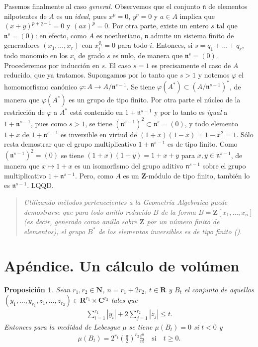 \documentclass[bibtotoc,leqno,spanish]{amsbook}
\newcommand{\RR}{\mathbf{R}}
\newcommand{\ZZ}{\mathbf{Z}}
\newcommand{\NN}{\mathbf{N}}
\newcommand{\CC}{\mathbf{C}}
\newcommand{\idl}[1]{\mathfrak{#1}}
\newcommand{\QED}{LQQD.}
\newcommand{\abs}[1]{\left\lvert#1\right\rvert}
\renewcommand{\to}[1][]{\xrightarrow{#1}}
\numberwithin{equation}{section}
\newenvironment{comm}%
	{\begin{quotation}\itshape\Small}
	{\end{quotation}}
\theoremstyle{note}
\theoremstyle{note}
\newtheorem*{proposition*}{Proposici\'on}
\theoremstyle{rem}
\numberwithin{theorem}{section}
\numberwithin{proposition}{section}
\numberwithin{definition}{section}
\numberwithin{lemma}{section}
\numberwithin{corollary}{section}
\numberwithin{example}{section}
\numberwithin{footnote}{section}%
\begin{document}
Pasemos finalmente al caso {\em general.} Observemos que el conjunto $\idl{n}$ de elementos nilpotentes de $A$
es un {\em ideal,} pues $x^{p}=0$, $y^{p}=0$ y $a\in A$ implica que $(x+y)^{p+q-1}=0$ y $(ax)^{p}=0$. Por otra parte,
existe un entero $s$ tal que $\idl{n}^{s}=(0)$: en efecto, como $A$ es noetheriano, $\idl{n}$ admite un sistema
finito de generadores $(x_{1},\dots,x_{r})$ con $x_{i}^{q_{i}}=0$ para todo $i$. Entonces, si $s = q_{1}+\dots+q_{r}$,
todo monomio en los $x_{i}$ de grado $s$ es nulo, de manera que $\idl{n}^{s}=(0)$. Procederemos por inducci\'on
en $s$. El caso $s=1$ es precisamente el caso de $A$ reducido, que ya tratamos. Supongamos por lo tanto que
$s>1$ y notemos $\varphi$ el homomorfismo can\'onico $\varphi:A\to A/\idl{n}^{s-1}$. Se tiene
$\varphi(A^{*})\subset(A/\idl{n}^{s-1})^{*}$, de manera que $\varphi(A^{*})$ es un grupo de tipo finito. Por
otra parte el n\'ucleo de la restricci\'on de $\varphi$ a $A^{*}$ est\'a contenido en $1+\idl{n}^{s-1}$ y
por lo tanto es {\em igual} a $1+\idl{n}^{s-1}$, pues como $s>1$, se tiene $(\idl{n}^{s-1})^{2}\subset\idl{n}^{s}=(0)$,
y todo elemento $1+x$ de $1+\idl{n}^{s-1}$ es inversible en virtud de
$(1+x)(1-x) = 1-x^{2}=1$. S\'olo resta demostrar que el grupo multiplicativo $1+\idl{n}^{s-1}$ es de tipo finito.
Como $(\idl{n}^{s-1})^{2}=(0)$ se tiene $(1+x)(1+y) = 1+x+y$ para $x,y\in\idl{n}^{s-1}$, de manera que
$x\mapsto 1+x$ es un isomorfismo del grupo aditivo $\idl{n}^{s-1}$ sobre el grupo multiplicativo $1+\idl{n}^{s-1}$.
Pero, como $A$ es un $\ZZ$-m\'odulo de tipo finito, tambi\'en lo es $\idl{n}^{s-1}$. \QED

\begin{comm}
Utilizando m\'etodos pertenecientes a la Geometr\'ia Algebraica puede demostrarse que para todo anillo
{\em reducido} $B$ de la forma $B = \ZZ[x_{1},\dots,x_{n}]$ (es decir, generado como anillo sobre $\ZZ$ por un
n\'umero finito de elementos), el grupo $B^{*}$ de los elementos inversibles es de tipo finito (\cite{Samuel1}).
\end{comm}

\section*[Un c\'alculo de vol\'umen]{Ap\'endice. Un c\'alculo de vol\'umen}

\begin{proposition*}
Sean $r_{1},r_{2}\in\NN$, $n=r_{1}+2r_{2}$, $t\in\RR$ y $B_{t}$ el conjunto de aquellos
$(y_{1},\dots,y_{r_{1}},z_{1},\dots,z_{r_{2}})\in\RR^{r_{1}}\times\CC^{r_{2}}$ tales que
\begin{gather}
\sum_{i=1}^{r_{1}}\abs{y_{i}}+2\sum_{j=1}^{r_{2}}\abs{z_{j}}\leq t.
\end{gather}
Entonces para la medidad de Lebesgue $\mu$ se tiene $\mu(B_{t})=0$ si $t < 0$ y
\begin{gather}\label{eq-4-ap-2}
\mu(B_{t}) = 2^{r_{1}}\left(\frac{\pi}{2}\right)^{r_{2}}\frac{t^{n}}{n!}\quad\text{si}\quad t\geq 0.
\end{gather}
\end{proposition*}
\end{document}
